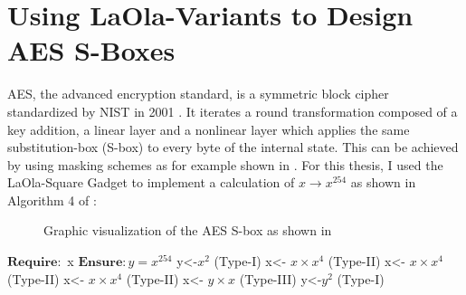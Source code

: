 \documentclass[english, version-2020-11]{uzl-thesis}
\begin{document}
\section{Using LaOla-Variants to Design AES S-Boxes}
AES, the advanced encryption standard, is a symmetric block cipher standardized by NIST in 2001 \cite{nist2001aes}. It iterates a round transformation composed of a key addition, a linear layer and a nonlinear layer which applies the same substitution-box (S-box) to every byte of the internal state\cite{ProvablySecureAESMasking}. This can be achieved by using masking schemes as for example shown in \cite{ProvablySecureAESMasking}. For this thesis, I used the LaOla-Square Gadget to implement a calculation of $x \rightarrow x^{254}$ as shown in Algorithm 4 of \cite{SBoxes}:

\begin{figure}[htbp!]
  \centering
  \caption{Graphic visualization of the AES S-box as shown in \cite{SBoxes}}
  \label{fig:SBox}
\end{figure}


  \begin{Pseudocode}[caption={Exponentiation to the 254 as shown in Algorithm 4 in \cite{SBoxes}}, label ={alg:sboxes}]

    $\mathbf{Require:}$ x 
    $\mathbf{Ensure: }y=x^{254}$ 
      y<-$x^2$                    (Type-I)
      x<- $x \times x^4$          (Type-II)
      x<- $x \times x^4$          (Type-II)
      x<- $x \times x^4$          (Type-II)
      x<- $y \times x$          (Type-III)
      y<-$y^2$                    (Type-I)


  \end{Pseudocode}
\end{document}
